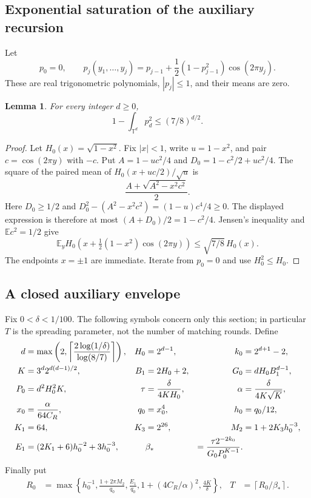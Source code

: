 \documentclass[11pt]{article}
\newtheorem{lemma}[theorem]{Lemma}
\theoremstyle{remark}
\newcommand{\T}{\mathbb T}
\newcommand{\E}{\mathbb E}
\newcommand{\ceil}[1]{\left\lceil #1\right\rceil}
\begin{document}
\subsection{Exponential saturation of the auxiliary recursion}

Let
\[
 p_0=0,\qquad
 p_j(y_1,\ldots,y_j)=p_{j-1}
       +\frac12(1-p_{j-1}^2)\cos(2\pi y_j).
\]
These are real trigonometric polynomials, $|p_j|\le1$, and their means
are zero.

\begin{lemma}\label{lem:saturation}
For every integer $d\ge0$,
\[
 1-\int_{\T^d}p_d^2\le(7/8)^{d/2}.
\]
\end{lemma}

\begin{proof}
Let $H_0(x)=\sqrt{1-x^2}$. Fix $|x|<1$, write $u=1-x^2$, and pair
$c=\cos(2\pi y)$ with $-c$. Put
$A=1-uc^2/4$ and $D_0=1-c^2/2+uc^2/4$. The square of the paired mean
of $H_0(x+uc/2)/\sqrt u$ is
\[
 \frac{A+\sqrt{A^2-x^2c^2}}2.
\]
Here $D_0\ge1/2$ and
$D_0^2-(A^2-x^2c^2)=(1-u)c^4/4\ge0$. The displayed expression is
therefore at most $(A+D_0)/2=1-c^2/4$. Jensen's inequality and
$\E c^2=1/2$ give
\[
 \E_y H_0\left(x+\tfrac12(1-x^2)\cos(2\pi y)\right)
 \le\sqrt{7/8}\,H_0(x).
\]
The endpoints $x=\pm1$ are immediate. Iterate from $p_0=0$ and use
$H_0^2\le H_0$.
\end{proof}

\subsection{A closed auxiliary envelope}

Fix $0<\delta<1/100$. The following symbols concern only this section;
in particular $T$ is the spreading parameter, not the number of matching
rounds. Define
\begin{align}
 d&=\max\left(2,\ceil{\frac{2\log(1/\delta)}{\log(8/7)}}\right),
 &H_0&=2^{d-1},& k_0&=2^{d+1}-2,\notag\\
 K&=3^d2^{d(d-1)/2},& B_1&=2H_0+2,&G_0&=dH_0B_1^{d-1},\notag\\
 P_0&=d^2H_0^2K,&\tau&=\frac{\delta}{4KH_0},
 &\alpha&=\frac{\delta}{4K\sqrt K},                  \label{eq:aux-data}\\
 x_0&=\frac{\alpha}{64C_R},&q_0&=x_0^4,&h_0&=q_0/12,\notag\\
 K_1&=64,&K_3&=2^{26},&M_2&=1+2K_3h_0^{-3},\notag\\
 E_1&=(2K_1+6)h_0^{-2}+3h_0^{-3},&&
 \beta_*&=\frac{\tau 2^{-2k_0}}{G_0P_0^{K-1}}.\notag
\end{align}
Finally put
\begin{align}
 R_0&=\max\left\{h_0^{-1},\frac{1+2\pi M_2}{q_0},\frac{E_1}{q_0},
                 1+(4C_R/\alpha)^2,\frac{4K}{\delta}\right\},
 &T&=\ceil{R_0/\beta_*}.                             \label{eq:spreading-T}
\end{align}
\end{document}
